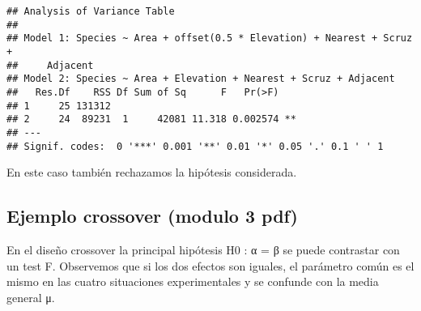 \documentclass[
]{article}
\begin{document}
\begin{verbatim}
## Analysis of Variance Table
## 
## Model 1: Species ~ Area + offset(0.5 * Elevation) + Nearest + Scruz + 
##     Adjacent
## Model 2: Species ~ Area + Elevation + Nearest + Scruz + Adjacent
##   Res.Df    RSS Df Sum of Sq      F   Pr(>F)   
## 1     25 131312                                
## 2     24  89231  1     42081 11.318 0.002574 **
## ---
## Signif. codes:  0 '***' 0.001 '**' 0.01 '*' 0.05 '.' 0.1 ' ' 1
\end{verbatim}

En este caso también rechazamos la hipótesis considerada.

\hypertarget{ejemplo-crossover-modulo-3-pdf}{%
\subsection{Ejemplo crossover (modulo 3
pdf)}\label{ejemplo-crossover-modulo-3-pdf}}

En el diseño crossover la principal hipótesis H0 : α = β se puede
contrastar con un test F. Observemos que si los dos efectos son iguales,
el parámetro común es el mismo en las cuatro situaciones experimentales
y se confunde con la media general μ.
\end{document}
